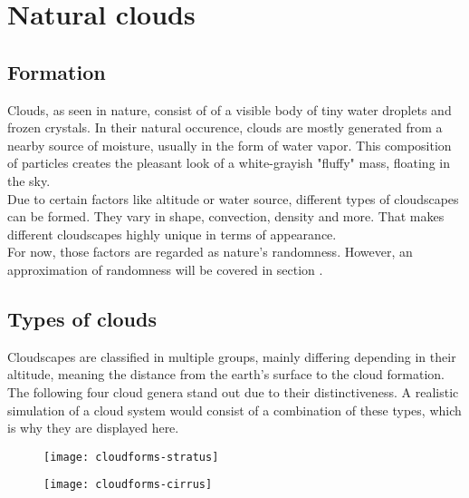\section{Natural clouds}

\subsection{Formation}
Clouds, as seen in nature, consist of of a visible body of tiny water droplets and frozen crystals. 
In their natural occurence, clouds are mostly generated from a nearby source of moisture, usually in the form of water vapor. 
This composition of particles creates the pleasant look of a white-grayish "fluffy" mass, floating in the sky.
\\
Due to certain factors like altitude or water source, different types of cloudscapes can be formed. They vary in shape, \gls{convection}, density and more.
That makes different cloudscapes highly unique in terms of appearance.
\\
For now, those factors are regarded as nature's randomness. However, an approximation of randomness will be covered in section .


\subsection{Types of clouds}
\label{section:cloud-types}
Cloudscapes are classified in multiple groups, mainly differing depending in their altitude, meaning the distance from the earth's surface to the cloud formation.
The following four cloud genera stand out due to their distinctiveness. A realistic simulation of a cloud system would consist of a combination of these types, which is why they are displayed here.
\begin{figure}[ht]
    \centering
        \begin{minipage}{0.47\linewidth}
            \texttt{[image: cloudforms-stratus]}
            \label{img:photo:cloudforms-stratus}        
        \end{minipage}        
    \hfill
        \begin{minipage}{0.47\linewidth}
            \texttt{[image: cloudforms-cirrus]}
            \label{img:photo:cloudforms-cirrus}        
        \end{minipage}
\end{figure}

